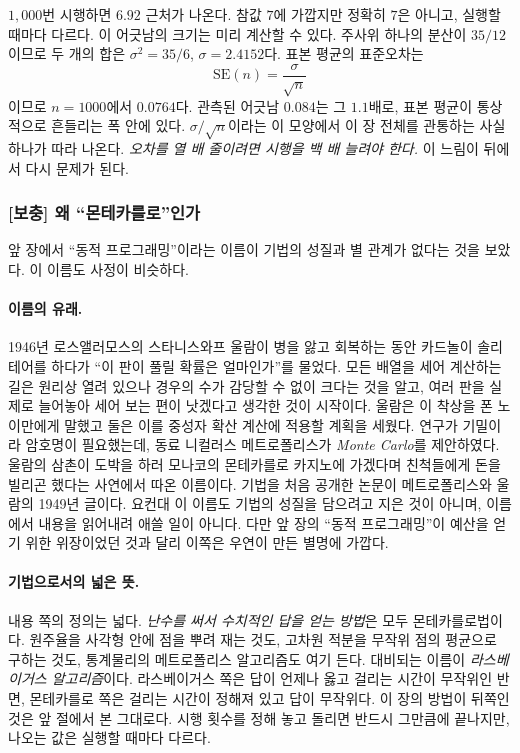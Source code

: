 \documentclass[11pt,a4paper]{article}
\begin{document}
$1{,}000$번 시행하면 $6.92$ 근처가 나온다. 참값 $7$에 가깝지만 정확히 $7$은 아니고, 실행할 때마다
다르다. 이 어긋남의 크기는 미리 계산할 수 있다. 주사위 하나의 분산이 $35/12$이므로 두 개의 합은
$\sigma^2 = 35/6$, $\sigma = 2.4152$다. 표본 평균의 표준오차는
\begin{equation*}
  \mathrm{SE}(n) = \frac{\sigma}{\sqrt{n}}
\end{equation*}
이므로 $n=1000$에서 $0.0764$다. 관측된 어긋남 $0.084$는 그 $1.1$배로, 표본 평균이 통상적으로 흔들리는
폭 안에 있다. $\sigma/\sqrt{n}$이라는 이 모양에서 이 장 전체를 관통하는 사실 하나가 따라 나온다. \emph{오차를 열 배
줄이려면 시행을 백 배 늘려야 한다.} 이 느림이 뒤에서 다시 문제가 된다.

\subsubsection{[보충] 왜 ``몬테카를로''인가}
\label{sec:whymc}

앞 장에서 ``동적 프로그래밍''이라는 이름이 기법의 성질과 별 관계가 없다는 것을 보았다. 이 이름도
사정이 비슷하다.

\paragraph{이름의 유래.}
1946년 로스앨러모스의 스타니스와프 울람이 병을 앓고 회복하는 동안 카드놀이 솔리테어를 하다가
``이 판이 풀릴 확률은 얼마인가''를 물었다. 모든 배열을 세어 계산하는 길은 원리상 열려 있으나 경우의
수가 감당할 수 없이 크다는 것을 알고, 여러 판을 실제로 늘어놓아 세어 보는 편이 낫겠다고 생각한
것이 시작이다\cite{ulam}. 울람은 이 착상을 폰 노이만에게 말했고 둘은 이를 중성자 확산 계산에 적용할
계획을 세웠다. 연구가 기밀이라 암호명이 필요했는데, 동료 니컬러스 메트로폴리스가 \emph{Monte Carlo}를
제안하였다. 울람의 삼촌이 도박을 하러 모나코의 몬테카를로 카지노에 가겠다며 친척들에게 돈을 빌리곤
했다는 사연에서 따온 이름이다. 기법을 처음 공개한 논문이 메트로폴리스와 울람의 1949년
글\cite{metropolis}이다. 요컨대 이 이름도 기법의 성질을 담으려고 지은 것이 아니며, 이름에서 내용을
읽어내려 애쓸 일이 아니다. 다만 앞 장의 ``동적 프로그래밍''이 예산을 얻기 위한 위장이었던 것과 달리
이쪽은 우연이 만든 별명에 가깝다.

\paragraph{기법으로서의 넓은 뜻.}
내용 쪽의 정의는 넓다. \emph{난수를 써서 수치적인 답을 얻는 방법}은 모두 몬테카를로법이다. 원주율을
사각형 안에 점을 뿌려 재는 것도, 고차원 적분을 무작위 점의 평균으로 구하는 것도, 통계물리의
메트로폴리스 알고리즘도 여기 든다. 대비되는 이름이 \emph{라스베이거스 알고리즘}이다. 라스베이거스
쪽은 답이 언제나 옳고 걸리는 시간이 무작위인 반면, 몬테카를로 쪽은 걸리는 시간이 정해져 있고 답이
무작위다. 이 장의 방법이 뒤쪽인 것은 앞 절에서 본 그대로다. 시행 횟수를 정해 놓고 돌리면 반드시
그만큼에 끝나지만, 나오는 값은 실행할 때마다 다르다.
\end{document}

